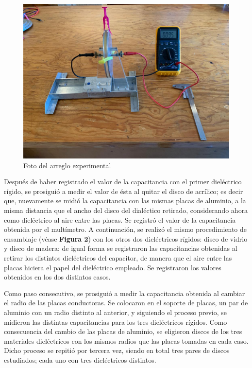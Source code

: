 \documentclass[letterpaper, 11 pt]{article}
\begin{document}
\begin{multicols}{2}
\begin{figure}[H]
    \captionsetup{justification=centering,margin=2cm}
    \includegraphics[scale=0.20]{adiosivana.jpeg}
    \caption{Foto del arreglo experimental}
    \centering
\end{figure}

Después de haber registrado el valor de la capacitancia con el primer dieléctrico rígido, se prosiguió a medir el valor de ésta al quitar el disco de acrílico; es decir que, nuevamente se midió la capacitancia con las mismas placas de aluminio, a la misma distancia que el ancho del disco del dialéctico retirado, considerando ahora como dieléctrico al aire entre las placas. Se registró el valor de la capacitancia obtenida por el multímetro. 
A continuación, se realizó el mismo procedimiento de ensamblaje (véase \textbf{Figura 2}) con los otros dos dieléctricos rígidos: disco de vidrio y disco de madera; de igual forma se registraron las capacitancias obtenidas al retirar los distintos dieléctricos del capacitor, de manera que el aire entre las placas hiciera el papel del dieléctrico empleado. Se registraron los valores obtenidos en los dos distintos casos. 

Como paso consecutivo, se prosiguió a medir la capacitancia obtenida al cambiar el radio de las placas conductoras. Se colocaron en el soporte de placas, un par de aluminio con un radio distinto al anterior, y siguiendo el proceso previo, se midieron las distintas capacitancias para los tres dieléctricos rígidos. Como consecuencia del cambio de las placas de aluminio, se eligieron discos de los tres materiales dieléctricos con los mismos radios que las placas tomadas en cada caso. Dicho proceso se repitió por tercera vez, siendo en total tres pares de discos estudiados; cada uno con tres dieléctricos distintos.


\end{multicols}
\end{document}
